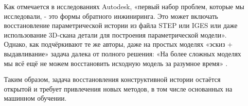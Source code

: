 Как отмечается в исследованиях Autodesk, «первый набор проблем, которые мы исследовали, - это формы обратного инжиниринга. Это может включать восстановление параметрической истории из файла STEP или IGES или даже использование 3D-скана детали для построения параметрической модели». Однако, как подчёркивают те же авторы, даже на простых моделях «эскиз + выдавливание» задача далека от полного решения: «На более сложных моделях мы всё ещё не можем восстановить исходную модель за разумное время» \cite{autodesk2020}.

Таким образом, задача восстановления конструктивной истории остаётся открытой и требует привлечения новых методов, в том числе основанных на машинном обучении.

